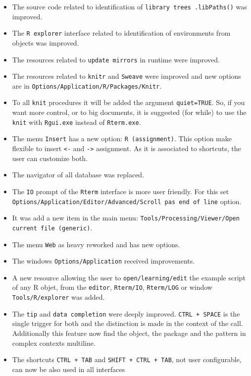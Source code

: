 \begin{itemize}
  \item The source code related to identification of \texttt{library trees .libPaths()} was improved.
  \item The \texttt{R explorer} interface related to identification of environments from objects was improved.
  \item The resources related to \texttt{update mirrors} in runtime were improved.
  \item The resources related to \texttt{knitr} and \texttt{Sweave} were improved and new options are in \texttt{Options/Application/R/Packages/Knitr}.
  \item To all \texttt{knit} procedures it will be added the argument \texttt{quiet=TRUE}.
    So, if you want more control, or to big documents, it is suggested (for while) to use the \texttt{knit}
    with \texttt{Rgui.exe} instead of \texttt{Rterm.exe}.
  \item The menu \texttt{Insert} has a new option: \texttt{R (assignment)}. This option make flexible
    to insert \texttt{<-} and \texttt{->} assignment. As it is associated to shortcuts, the user can customize both.
  \item The navigator of all database was replaced.
  \item The \texttt{IO} prompt of the \texttt{Rterm} interface is more user friendly. For this
    set \texttt{Options/Application/Editor/Advanced/Scroll pas end of line} option.
  \item It was add a new item in the main menu: \texttt{Tools/Processing/Viewer/Open current file (generic)}.
  \item The menu \texttt{Web} as heavy reworked and has new options.
  \item The windows \texttt{Options/Application} received improvements.
  \item A new resource allowing the user to \texttt{open/learning/edit} the example script of any R objet,
    from the \texttt{editor}, \texttt{Rterm/IO}, \texttt{Rterm/LOG} or window \texttt{Tools/R/explorer} was added.
  \item The \texttt{tip} and \texttt{data completion} were deeply improved.
    \texttt{CTRL + SPACE} is the single trigger for both and the distinction is made in the context of the call.
    Additionally this feature now find the object, the package and the pattern in complex contexts multiline.
  \item The shortcuts \texttt{CTRL + TAB} and \texttt{SHIFT + CTRL + TAB}, not user configurable, can now be also used in all interfaces

\end{itemize}
